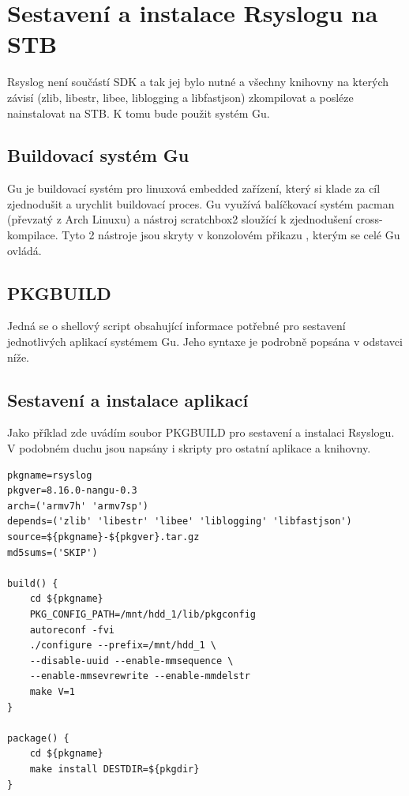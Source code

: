 \documentclass[thesis=B,czech]{FITthesis}[2012/06/26]
\begin{document}
\section{Sestavení a instalace Rsyslogu na STB}
 
Rsyslog není součástí SDK a tak jej bylo nutné a všechny knihovny na kterých závisí (zlib, libestr, libee, liblogging a libfastjson) zkompilovat a posléze nainstalovat na STB. K tomu bude použit systém Gu.

\subsection{Buildovací systém Gu}
Gu je buildovací systém pro linuxová embedded zařízení, který si klade za cíl zjednodušit a urychlit buildovací proces. Gu využívá balíčkovací systém pacman (převzatý z Arch Linuxu) a nástroj scratchbox2 sloužící k zjednodušení cross-kompilace. Tyto 2 nástroje jsou skryty v konzolovém přikazu , kterým se celé Gu ovládá.

\subsection{PKGBUILD}
Jedná se o shellový script obsahující informace potřebné pro sestavení jednotlivých aplikací systémem Gu. Jeho syntaxe je podrobně popsána v odstavci níže.

\subsection{Sestavení a instalace aplikací}
Jako příklad zde uvádím soubor PKGBUILD pro sestavení a instalaci Rsyslogu. V podobném duchu jsou napsány i skripty pro ostatní aplikace a knihovny.
\begin{lstlisting}[style=PKGBuildStyle]
pkgname=rsyslog
pkgver=8.16.0-nangu-0.3
arch=('armv7h' 'armv7sp')
depends=('zlib' 'libestr' 'libee' 'liblogging' 'libfastjson')
source=${pkgname}-${pkgver}.tar.gz
md5sums=('SKIP')

build() {
	cd ${pkgname}
	PKG_CONFIG_PATH=/mnt/hdd_1/lib/pkgconfig
	autoreconf -fvi
	./configure --prefix=/mnt/hdd_1 \
	--disable-uuid --enable-mmsequence \
	--enable-mmsevrewrite --enable-mmdelstr
	make V=1
}

package() {
	cd ${pkgname}
	make install DESTDIR=${pkgdir}
}
\end{lstlisting}
\end{document}
